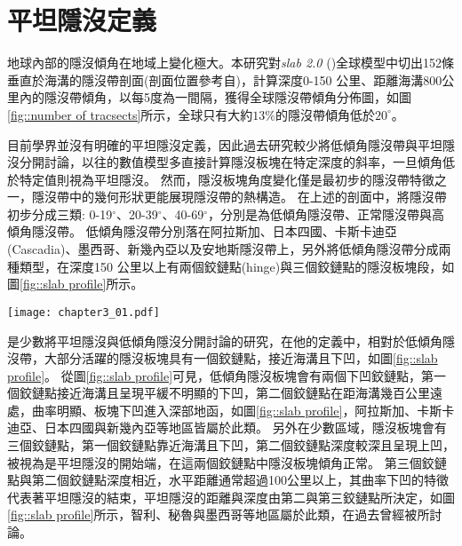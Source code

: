 \section{平坦隱沒定義}\label{平坦隱沒定義}

地球內部的隱沒傾角在地域上變化極大。本研究對\textsl{slab 2.0} (\citealp{hayes2018slab2})全球模型中切出152條垂直於海溝的隱沒帶剖面(剖面位置參考自\citealp{Hu2020})，計算深度0-150 公里、距離海溝800公里內的隱沒帶傾角，以每5度為一間隔，獲得全球隱沒帶傾角分佈圖，如圖\ref{fig::number of tracsects}所示，全球只有大約$13\%$的隱沒帶傾角低於$20^\circ$。

目前學界並沒有明確的平坦隱沒定義，因此過去研究較少將低傾角隱沒帶與平坦隱沒分開討論，以往的數值模型多直接計算隱沒板塊在特定深度的斜率，一旦傾角低於特定值則視為平坦隱沒。
然而，隱沒板塊角度變化僅是最初步的隱沒帶特徵之一，隱沒帶中的幾何形狀更能展現隱沒帶的熱構造。
在上述的剖面中，將隱沒帶初步分成三類: 0-19$^\circ$、20-39$^\circ$、40-69$^\circ$，分別是為低傾角隱沒帶、正常隱沒帶與高傾角隱沒帶。
低傾角隱沒帶分別落在阿拉斯加、日本四國、卡斯卡迪亞(Cascadia)、墨西哥、新幾內亞以及安地斯隱沒帶上，\citet{schellart2020control}另外將低傾角隱沒帶分成兩種類型，在深度150 公里以上有兩個鉸鏈點(hinge)與三個鉸鏈點的隱沒板塊段，如圖\ref{fig::slab profile}所示。

\begin{figure*}[ht!]
    \centering
    \texttt{[image: chapter3\_01.pdf]}
    \caption[全球152條隱沒帶剖面傾角長條分布圖]{全球152條隱沒帶剖面傾角長條分布圖，其中綠底為隱沒剖面傾角低於20$^{\circ}$的剖面個數，佔整體13$\%$;粉紅底為剖面傾角介於20$^{\circ}$-39$^\circ$之間的剖面個數，佔整體$73\%$，粉藍底則為剖面傾角高於$40^\circ$的剖面個數，佔總體$14\%$。}
    \label{fig::number of tracsects}
\end{figure*}

\citet{schellart2020control}是少數將平坦隱沒與低傾角隱沒分開討論的研究，在他的定義中，相對於低傾角隱沒帶，大部分活躍的隱沒板塊具有一個鉸鏈點，接近海溝且下凹，如圖\ref{fig::slab profile}。
從圖\ref{fig::slab profile}可見，低傾角隱沒板塊會有兩個下凹鉸鏈點，第一個鉸鏈點接近海溝且呈現平緩不明顯的下凹，第二個鉸鏈點在距海溝幾百公里遠處，曲率明顯、板塊下凹進入深部地函，如圖\ref{fig::slab profile}，阿拉斯加、卡斯卡迪亞、日本四國與新幾內亞等地區皆屬於此類。
另外在少數區域，隱沒板塊會有三個鉸鏈點，第一個鉸鏈點靠近海溝且下凹，第二個鉸鏈點深度較深且呈現上凹，被視為是平坦隱沒的開始端，在這兩個鉸鏈點中隱沒板塊傾角正常。
第三個鉸鏈點與第二個鉸鏈點深度相近，水平距離通常超過100公里以上，其曲率下凹的特徵代表著平坦隱沒的結束，平坦隱沒的距離與深度由第二與第三鉸鏈點所決定，如圖\ref{fig::slab profile}所示，智利、秘魯與墨西哥等地區屬於此類，在過去曾經被\citet{Manea2017}所討論。



